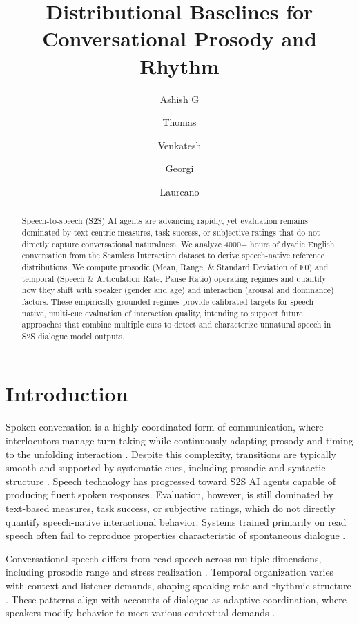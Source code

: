 \documentclass{Interspeech}
\title{Distributional Baselines for Conversational Prosody and Rhythm}
\author[affiliation={1}, orcid=0009-0006-4979-3701, correspondingauthor]{Ashish G}{Hallur}
\author[affiliation={1}, orcid=0000-0001-8953-7872]{Thomas}{Thebaud}
\author[affiliation={2}, orcid=0009-0001-7214-2919]{Venkatesh}{Ravichandran}
\author[affiliation={3}, orcid=0000-0002-9910-6598]{Georgi}{Tinchev}
\author[affiliation={1}, orcid=0000-0002-3033-7005]{Laureano}{Moro-Velazquez}
\begin{document}
\maketitle

\begin{abstract}
Speech-to-speech (S2S) AI agents are advancing rapidly, yet evaluation remains dominated by text-centric measures, task success, or subjective ratings that do not directly capture conversational naturalness. 
We analyze 4000+ hours of dyadic English conversation from the Seamless Interaction dataset to derive speech-native reference distributions. 
We compute prosodic (Mean, Range, \& Standard Deviation of F0) and temporal (Speech \& Articulation Rate, Pause Ratio) operating regimes and quantify how they shift with speaker (gender and age) and interaction (arousal and dominance) factors.
These empirically grounded regimes provide calibrated targets for speech-native, multi-cue evaluation of interaction quality, intending to support future approaches that combine multiple cues to detect and characterize unnatural speech in S2S dialogue model outputs.
\end{abstract}

\section{Introduction}

Spoken conversation is a highly coordinated form of communication, where interlocutors manage turn-taking while continuously adapting prosody and timing to the unfolding interaction \cite{riest_anticipation_2015, levinson_turn-taking_2016}. 
Despite this complexity, transitions are typically smooth and supported by systematic cues, including prosodic and syntactic structure \cite{koiso_analysis_1998}.
Speech technology has progressed toward S2S AI agents capable of producing fluent spoken responses. 
Evaluation, however, is still dominated by text-based measures, task success, or subjective ratings, which do not directly quantify speech-native interactional behavior. 
Systems trained primarily on read speech often fail to reproduce properties characteristic of spontaneous dialogue \cite{omahony_combining_2022}.

Conversational speech differs from read speech across multiple dimensions, including prosodic range and stress realization \cite{howell1991comparison, hazan2010does}. 
Temporal organization varies with context and listener demands, shaping speaking rate and rhythmic structure \cite{tauroza_speech_1990, ward_automatic_2004, dowding_user_2024, xie_speaking_2024}. 
These patterns align with accounts of dialogue as adaptive coordination, where speakers modify behavior to meet various contextual demands \cite{fusaroli_dialog_2014, wynn_conversational_2024}.
\end{document}
